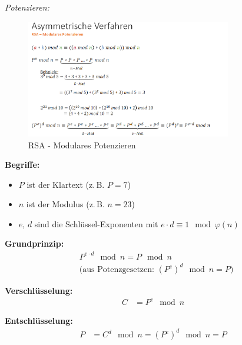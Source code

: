 \documentclass[a4paper,12pt]{article}
\begin{document}
\vspace*{1em}
\begin{tcolorbox}[title=Potenzieren, colback=green!5!white, colframe=green!75!black]
\textit{Potenzieren:}
\begin{figure}[H]
    \centering
    \includegraphics[width=0.8\textwidth]{bilder/potenzieren.png}
    \caption{RSA - Modulares Potenzieren}
    \label{fig:inverse}
\end{figure}
\end{tcolorbox}
\begin{tcolorbox}[title=Asymmetrische Verschlüsselung – RSA, colback=blue!5!white, colframe=blue!75!black]
    \textbf{Begriffe:}
    \begin{itemize}
      \item $P$ ist der Klartext (z.\,B. $P = 7$)
      \item $n$ ist der Modulus (z.\,B. $n = 23$)
      \item $e$, $d$ sind die Schlüssel-Exponenten mit $e \cdot d \equiv 1 \mod \varphi(n)$
    \end{itemize}
    
    \textbf{Grundprinzip:}
    \begin{align*}
      &P^{e \cdot d} \mod n = P \mod n \\
      &\text{(aus Potenzgesetzen: } (P^e)^d \mod n = P \text{)}
    \end{align*}
    
    \textbf{Verschlüsselung:}
    \begin{align*}
      C &= P^e \mod n
    \end{align*}
    
    \textbf{Entschlüsselung:}
    \begin{align*}
      P &= C^d \mod n = (P^e)^d \mod n = P
    \end{align*}
    \end{tcolorbox}
    
\end{document}

